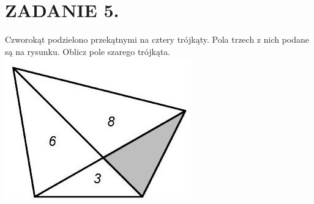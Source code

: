 \documentclass[10pt]{article}
\begin{document}
\section*{ZADANIE 5.}
Czworokąt podzielono przekątnymi na cztery trójkąty. Pola trzech z nich podane są na rysunku. Oblicz pole szarego trójkąta.\\
\includegraphics[max width=\textwidth, center]{2024_11_21_ad1a2131fc305a932f44g-1}
\end{document}
